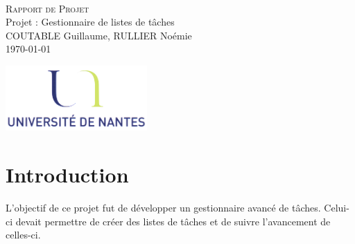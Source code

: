 \documentclass[a4paper,10pt]{article}
\begin{document}
\fancyhead[LE,CE,RE,LO,CO,RO]{}
\fancyfoot[LE,CE,RE,LO,CO,RO]{}
\renewcommand{\headrulewidth}{0.4pt}
\renewcommand{\footrulewidth}{0.4pt}

\begin{titlepage}

\vspace*{\fill}~
\begin{center}
{\large \textsc{Rapport de Projet}} \\
\vspace{1cm}
{\LARGE Projet : Gestionnaire de listes de tâches} \\
\vspace{1cm}
COUTABLE Guillaume, RULLIER Noémie \\
\today
\end{center}
\vspace*{\fill}

\begin{center}
\noindent 
\includegraphics[height=2.5cm]{Images/universite.png}
\end{center}
\pagebreak
\end{titlepage}

\newpage
\tableofcontents  

\newpage
\pagestyle{fancy}


\section{Introduction}
L'objectif de ce projet fut de développer un gestionnaire avancé de tâches. Celui-ci devait permettre de créer des listes de tâches et de suivre l'avancement de celles-ci.
\end{document}
